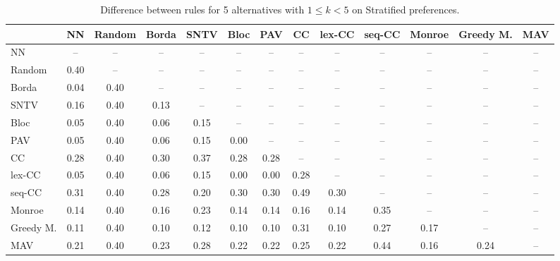 
\begin{table*}[htbp]
\centering
\begin{tabular}{lcccccccccccc}
\toprule
 & NN & Random & Borda & SNTV & Bloc & PAV & CC & lex-CC & seq-CC & Monroe & Greedy M. & MAV \\
\midrule
NN & -- & -- & -- & -- & -- & -- & -- & -- & -- & -- & -- & -- \\
Random & \cellcolor{blue!40} 0.40 & -- & -- & -- & -- & -- & -- & -- & -- & -- & -- & -- \\
Borda & \cellcolor{blue!4} 0.04 & \cellcolor{blue!40} 0.40 & -- & -- & -- & -- & -- & -- & -- & -- & -- & -- \\
SNTV & \cellcolor{blue!16} 0.16 & \cellcolor{blue!40} 0.40 & \cellcolor{blue!13} 0.13 & -- & -- & -- & -- & -- & -- & -- & -- & -- \\
Bloc & \cellcolor{blue!5} 0.05 & \cellcolor{blue!40} 0.40 & \cellcolor{blue!6} 0.06 & \cellcolor{blue!15} 0.15 & -- & -- & -- & -- & -- & -- & -- & -- \\
PAV & \cellcolor{blue!5} 0.05 & \cellcolor{blue!40} 0.40 & \cellcolor{blue!6} 0.06 & \cellcolor{blue!15} 0.15 & \cellcolor{blue!0} 0.00 & -- & -- & -- & -- & -- & -- & -- \\
CC & \cellcolor{blue!28} 0.28 & \cellcolor{blue!40} 0.40 & \cellcolor{blue!30} 0.30 & \cellcolor{blue!37} 0.37 & \cellcolor{blue!28} 0.28 & \cellcolor{blue!28} 0.28 & -- & -- & -- & -- & -- & -- \\
lex-CC & \cellcolor{blue!5} 0.05 & \cellcolor{blue!40} 0.40 & \cellcolor{blue!6} 0.06 & \cellcolor{blue!15} 0.15 & \cellcolor{blue!0} 0.00 & \cellcolor{blue!0} 0.00 & \cellcolor{blue!28} 0.28 & -- & -- & -- & -- & -- \\
seq-CC & \cellcolor{blue!31} 0.31 & \cellcolor{blue!40} 0.40 & \cellcolor{blue!28} 0.28 & \cellcolor{blue!20} 0.20 & \cellcolor{blue!30} 0.30 & \cellcolor{blue!30} 0.30 & \cellcolor{blue!49} 0.49 & \cellcolor{blue!30} 0.30 & -- & -- & -- & -- \\
Monroe & \cellcolor{blue!14} 0.14 & \cellcolor{blue!40} 0.40 & \cellcolor{blue!16} 0.16 & \cellcolor{blue!23} 0.23 & \cellcolor{blue!14} 0.14 & \cellcolor{blue!14} 0.14 & \cellcolor{blue!16} 0.16 & \cellcolor{blue!14} 0.14 & \cellcolor{blue!35} 0.35 & -- & -- & -- \\
Greedy M. & \cellcolor{blue!11} 0.11 & \cellcolor{blue!40} 0.40 & \cellcolor{blue!10} 0.10 & \cellcolor{blue!12} 0.12 & \cellcolor{blue!10} 0.10 & \cellcolor{blue!10} 0.10 & \cellcolor{blue!31} 0.31 & \cellcolor{blue!10} 0.10 & \cellcolor{blue!27} 0.27 & \cellcolor{blue!17} 0.17 & -- & -- \\
MAV & \cellcolor{blue!21} 0.21 & \cellcolor{blue!40} 0.40 & \cellcolor{blue!23} 0.23 & \cellcolor{blue!28} 0.28 & \cellcolor{blue!22} 0.22 & \cellcolor{blue!22} 0.22 & \cellcolor{blue!25} 0.25 & \cellcolor{blue!22} 0.22 & \cellcolor{blue!44} 0.44 & \cellcolor{blue!16} 0.16 & \cellcolor{blue!24} 0.24 & -- \\
\bottomrule
\end{tabular}

\caption{Difference between rules for 5 alternatives with $1 \leq k < 5$ on Stratified preferences.}
\label{tab:rule_distance_heatmap-m=[5]-pref_dist=stratification__args__weight=0.5}
\end{table*}
    